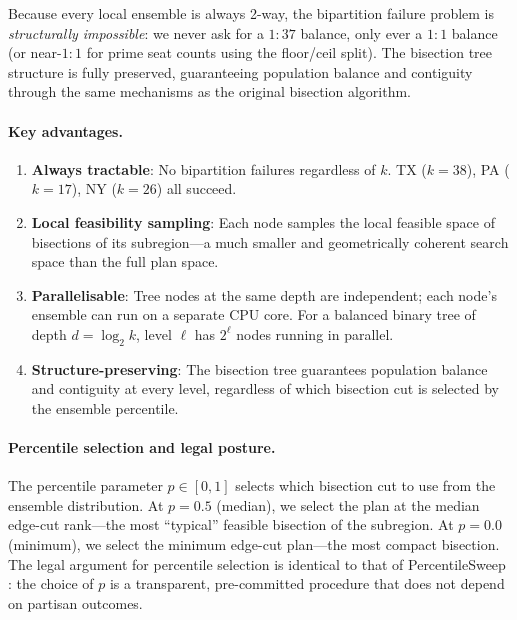 Because every local ensemble is always 2-way, the bipartition failure problem
is \emph{structurally impossible}: we never ask for a $1:37$ balance, only
ever a $1:1$ balance (or near-$1:1$ for prime seat counts using the
floor/ceil split). The bisection tree structure is fully preserved, guaranteeing
population balance and contiguity through the same mechanisms as the original
bisection algorithm.

\paragraph{Key advantages.}
\begin{enumerate}
  \item \textbf{Always tractable}: No bipartition failures regardless of $k$.
        TX ($k=38$), PA ($k=17$), NY ($k=26$) all succeed.
  \item \textbf{Local feasibility sampling}: Each node samples the local
        feasible space of bisections of its subregion---a much smaller and
        geometrically coherent search space than the full plan space.
  \item \textbf{Parallelisable}: Tree nodes at the same depth are independent;
        each node's ensemble can run on a separate CPU core. For a balanced
        binary tree of depth $d = \log_2 k$, level $\ell$ has $2^\ell$ nodes
        running in parallel.
  \item \textbf{Structure-preserving}: The bisection tree guarantees population
        balance and contiguity at every level, regardless of which bisection cut
        is selected by the ensemble percentile.
\end{enumerate}

\paragraph{Percentile selection and legal posture.}
The percentile parameter $p \in [0, 1]$ selects which bisection cut to use from
the ensemble distribution. At $p = 0.5$ (median), we select the plan at the
median edge-cut rank---the most ``typical'' feasible bisection of the subregion.
At $p = 0.0$ (minimum), we select the minimum edge-cut plan---the most compact
bisection. The legal argument for percentile selection is identical to that of
PercentileSweep \citep{dellaLibera2026percentilesweep}: the choice of $p$ is
a transparent, pre-committed procedure that does not depend on partisan outcomes.

